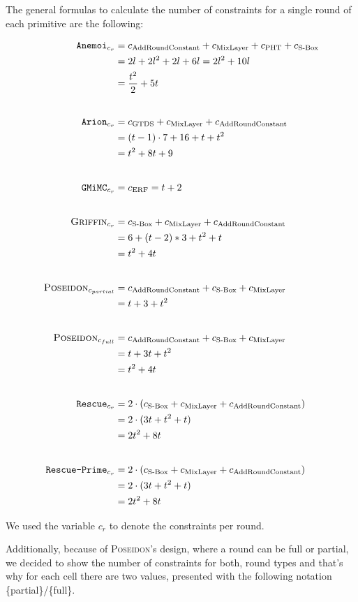 \documentclass[12pt, a4paper]{report}
\begin{document}
The general formulas to calculate the number of constraints for a single round of each primitive are the following:

\begin{align*}
  \texttt{Anemoi}_{c_r} & = c_{\text{AddRoundConstant}} + c_{\text{MixLayer}} + c_{\text{PHT}} + c_{\text{S-Box}} \\
    &= 2l + 2l^2 + 2l + 6l = 2l^2 + 10l \\
    &= \frac{t^2}{2} + 5t\\[20pt]
  \texttt{Arion}_{c_r} &= c_{\text{GTDS}} + c_{\text{MixLayer}} + c_{\text{AddRoundConstant}} \\
    &= (t-1) \cdot 7 + 16 + t + t^2 \\
    &= t^2 + 8t + 9\\[20pt]
  \texttt{GMiMC}_{c_r} &= c_{\text{ERF}} = t+2\\[20pt]
  \textsc{Griffin}_{c_r} &= c_{\text{S-Box}} + c_{\text{MixLayer}} + c_{\text{AddRoundConstant}} \\
    & = 6 + (t-2)*3 + t^2 + t \\
    & = t^2 + 4t\\[20pt]
  \textsc{Poseidon}_{c_{partial}} &= c_{\text{AddRoundConstant}} + c_{\text{S-Box}} + c_{\text{MixLayer}} \\
    &= t + 3 + t^2\\[20pt]
  \textsc{Poseidon}_{c_{full}} &= c_{\text{AddRoundConstant}} + c_{\text{S-Box}} + c_{\text{MixLayer}} \\ 
    &= t + 3t + t^2 \\
    &= t^2 + 4t\\[20pt]
  \texttt{Rescue}_{c_r} &= 2 \cdot (c_{\text{S-Box}} + c_{\text{MixLayer}} + c_{\text{AddRoundConstant}}) \\
    &= 2 \cdot (3t + t^2 + t) \\
    &= 2t^2 + 8t\\[20pt]
  \texttt{Rescue-Prime}_{c_r} &= 2 \cdot (c_{\text{S-Box}} + c_{\text{MixLayer}} + c_{\text{AddRoundConstant}}) \\
    &= 2 \cdot (3t + t^2 + t) \\
    &= 2t^2 + 8t
\end{align*}

We used the variable $c_r$ to denote the constraints per round.

Additionally, because of \textsc{Poseidon}'s design, where a round can be full or partial, we decided to show the number of constraints for both, round types and that's why for each cell there are two values, presented with the following notation \{partial\}/\{full\}.
\end{document}
